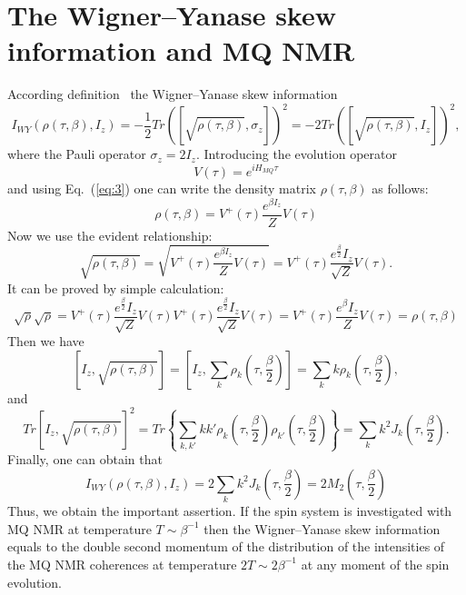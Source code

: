 \documentclass[preprint,12pt]{elsarticle}
\begin{document}
\section{The Wigner--Yanase skew information and MQ NMR}
\label{sec:3}
According definition~\cite{1,2} the Wigner--Yanase skew information
\begin{equation}
    \label{eq:14}
        I_{WY}(\rho(\tau,\beta),I_z) = -\frac{1}{2}
            Tr([\sqrt{\rho(\tau,\beta)},\sigma_z])^2 =
                -2Tr([\sqrt{\rho(\tau,\beta)},I_z])^2,
\end{equation}
where the Pauli operator $\sigma_z=2I_z$.
Introducing the evolution operator
\begin{equation}
    \label{eq:15}
        V(\tau) = e^{iH_{MQ}\tau}
\end{equation}
and using Eq.~(\ref{eq:3}) one can write the density matrix $\rho(\tau,\beta)$ as follows:
\begin{equation}
    \label{eq:16}
        \rho(\tau,\beta) = V^+(\tau) \frac{e^{\beta I_z}}{Z}V(\tau)
\end{equation}
Now we use the evident relationship:
\begin{equation}
    \label{eq:17}
        \sqrt{\rho(\tau,\beta)} =
            \sqrt{V^+(\tau)\frac{e^{\beta I_z}}{Z}V(\tau)} =
                V^+(\tau) \frac{e^{\frac{\beta}{2}}I_z}{\sqrt{Z}}V(\tau).
\end{equation}
It can be proved by simple calculation:
\begin{equation}
    \label{eq:18}
        \sqrt{\rho}\sqrt{\rho} =
            V^+(\tau)\frac{e^\frac{\beta}{2}I_z}{\sqrt{Z}}
                V(\tau)V^+(\tau)\frac{e^{\frac{\beta}{2}}I_z}{\sqrt{Z}}V(\tau) =
            V^+(\tau)\frac{e^\beta I_z}{Z}V(\tau) =
        \rho(\tau,\beta)
\end{equation}
%
Then we have
%
\begin{equation} \label{eq:19}
    \left[I_z,\sqrt{\rho(\tau,\beta)}\right]
    = \left[I_z, \sum_k \rho_k \left(\tau, \frac{\beta}{2}\right)\right]
    = \sum_k k\rho_k \left(\tau, \frac{\beta}{2}\right),
\end{equation}
%
and
%
\begin{equation} \label{eq:20}
	Tr\left[I_z,\sqrt{\rho(\tau,\beta)} \right]^2
	= Tr\left\{\sum_{k,k'}kk'
		\rho_k\left(\tau,\frac{\beta}{2}\right)
		\rho_{k'}\left(\tau,\frac{\beta}{2}\right)
	\right\}
	= \sum_k k^2 J_k\left(\tau,\frac{\beta}{2}\right).
\end{equation}
%
Finally, one can obtain that
%
\begin{equation} \label{eq:21}
    I_{WY}\left(\rho(\tau, \beta), I_z\right)
    = 2\sum_k k^2 J_k\left(\tau, \frac{\beta}{2}\right)
    = 2M_2\left(\tau, \frac{\beta}{2}\right)
\end{equation}
%
Thus, we obtain the important assertion.
If the spin system is investigated with MQ NMR at temperature $T\sim\beta^{-1}$ then the Wigner--Yanase skew information equals to the double second momentum of the distribution of the intensities of the MQ NMR coherences at temperature $2T \sim 2\beta^{-1}$ at any moment of the spin evolution.
\end{document}
